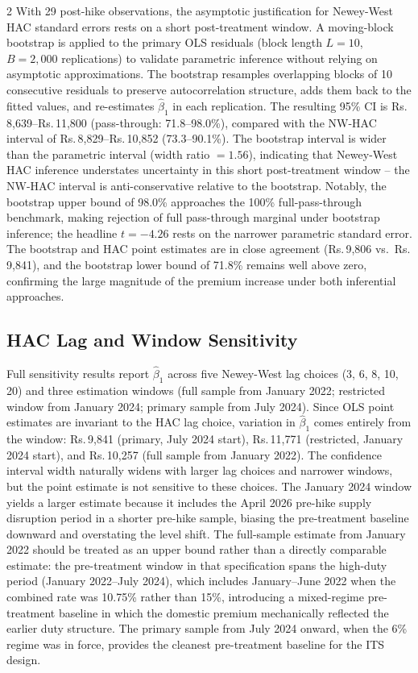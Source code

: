 \documentclass[12pt]{article}
\begin{document}
\begin{multicols}{2}
With 29 post-hike observations, the asymptotic justification for Newey-West HAC standard errors rests on a short post-treatment window. A moving-block bootstrap is applied to the primary OLS residuals (block length $L = 10$, $B = 2{,}000$ replications) to validate parametric inference without relying on asymptotic approximations. The bootstrap resamples overlapping blocks of 10 consecutive residuals to preserve autocorrelation structure, adds them back to the fitted values, and re-estimates $\hat{\beta}_1$ in each replication. The resulting 95\% CI is Rs.\,8,639--Rs.\,11,800 (pass-through: 71.8--98.0\%), compared with the NW-HAC interval of Rs.\,8,829--Rs.\,10,852 (73.3--90.1\%). The bootstrap interval is wider than the parametric interval (width ratio $= 1.56$), indicating that Newey-West HAC inference understates uncertainty in this short post-treatment window -- the NW-HAC interval is anti-conservative relative to the bootstrap. Notably, the bootstrap upper bound of 98.0\% approaches the 100\% full-pass-through benchmark, making rejection of full pass-through marginal under bootstrap inference; the headline $t = -4.26$ rests on the narrower parametric standard error. The bootstrap and HAC point estimates are in close agreement (Rs.\,9,806 vs.\ Rs.\,9,841), and the bootstrap lower bound of 71.8\% remains well above zero, confirming the large magnitude of the premium increase under both inferential approaches.

\subsection*{HAC Lag and Window Sensitivity}

Full sensitivity results report $\hat{\beta}_1$ across five Newey-West lag choices (3, 6, 8, 10, 20) and three estimation windows (full sample from January 2022; restricted window from January 2024; primary sample from July 2024). Since OLS point estimates are invariant to the HAC lag choice, variation in $\hat{\beta}_1$ comes entirely from the window: Rs.\,9,841 (primary, July 2024 start), Rs.\,11,771 (restricted, January 2024 start), and Rs.\,10,257 (full sample from January 2022). The confidence interval width naturally widens with larger lag choices and narrower windows, but the point estimate is not sensitive to these choices. The January 2024 window yields a larger estimate because it includes the April 2026 pre-hike supply disruption period in a shorter pre-hike sample, biasing the pre-treatment baseline downward and overstating the level shift. The full-sample estimate from January 2022 should be treated as an upper bound rather than a directly comparable estimate: the pre-treatment window in that specification spans the high-duty period (January 2022--July 2024), which includes January--June 2022 when the combined rate was 10.75\% rather than 15\%, introducing a mixed-regime pre-treatment baseline in which the domestic premium mechanically reflected the earlier duty structure. The primary sample from July 2024 onward, when the 6\% regime was in force, provides the cleanest pre-treatment baseline for the ITS design.


\end{multicols}
\end{document}
